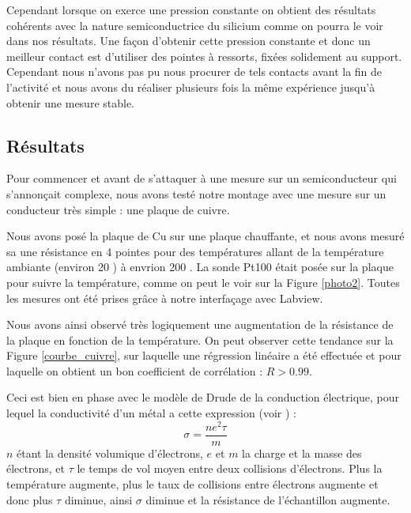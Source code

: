 Cependant lorsque on exerce une pression constante on obtient des résultats cohérents avec la nature semiconductrice du silicium comme on pourra le voir dans nos résultats. Une façon d'obtenir cette pression constante et donc un meilleur contact est d'utiliser des pointes à ressorts, fixées solidement au support. Cependant nous n'avons pas pu nous procurer de tels contacts avant la fin de l'activité et nous avons du réaliser plusieurs fois la même expérience jusqu'à obtenir une mesure stable.

\subsection{Résultats}
Pour commencer et avant de s'attaquer à une mesure sur un semiconducteur qui s'annonçait complexe, nous avons testé notre montage avec une mesure sur un conducteur très simple : une plaque de cuivre.

Nous avons posé la plaque de Cu sur une plaque chauffante, et nous avons mesuré sa une résistance en 4 pointes pour des températures allant de la température ambiante (environ 20 \celsius{}) à envrion 200 \celsius{}. La sonde Pt100 était posée sur la plaque pour suivre la température, comme on peut le voir sur la Figure \ref{photo2}. Toutes les mesures ont été prises grâce à notre interfaçage avec Labview.

Nous avons ainsi observé très logiquement une augmentation de la résistance de la plaque en fonction de la température. On peut observer cette tendance sur la Figure \ref{courbe_cuivre}, sur laquelle une régression linéaire a été effectuée et pour laquelle on obtient un bon coefficient de corrélation : $R > 0.99$.

Ceci est bien en phase avec le modèle de Drude de la conduction électrique, pour lequel la conductivité d'un métal a cette expression (voir \cite{kittel_introduction_1976}) : 
\begin{equation}
	\sigma = \frac{n e^{2} \tau}{m}
\end{equation}
$n$ étant la densité volumique d'électrons, $e$ et $m$ la charge et la masse des électrons, et $\tau$ le temps de vol moyen entre deux collisions d'électrons. Plus la température augmente, plus le taux de collisions entre électrons augmente et donc plus $\tau$ diminue, ainsi $\sigma$ diminue et la résistance de l'échantillon augmente.

